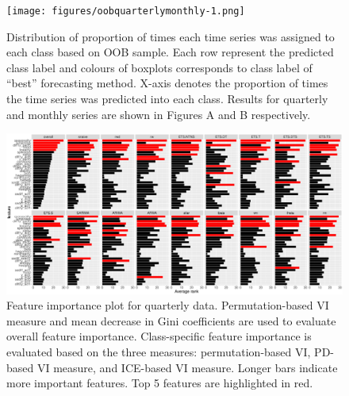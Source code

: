 \documentclass[11pt,a4paper,]{article}
\begin{document}
\clearpage

\begin{figure}
\centering
\texttt{[image: figures/oobquarterlymonthly-1.png]}
\caption{\label{fig:oobquarterlymonthly}Distribution of proportion of times
each time series was assigned to each class based on OOB sample. Each
row represent the predicted class label and colours of boxplots
corresponds to class label of ``best'' forecasting method. X-axis
denotes the proportion of times the time series was predicted into each
class. Results for quarterly and monthly series are shown in Figures A
and B respectively.}
\end{figure}

\clearpage

\begin{figure}[h]

{\centering \includegraphics{figures/viquarterly-1} 

}

\caption{Feature importance plot for quarterly data. Permutation-based VI measure and mean decrease in Gini coefficients are used to evaluate overall feature importance. Class-specific feature importance is evaluated based on the three measures: permutation-based VI, PD-based VI measure, and ICE-based VI measure. Longer bars indicate more important features. Top 5 features are highlighted in red.}\label{fig:viquarterly}
\end{figure}
\end{document}
